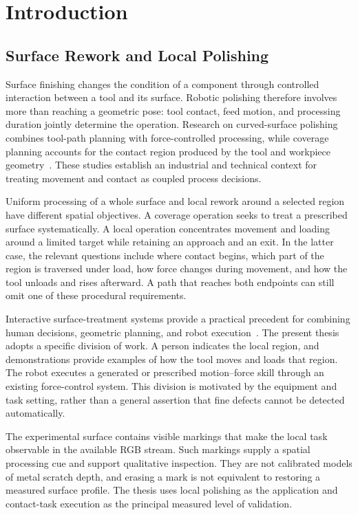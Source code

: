 \chapter{Introduction}
\label{chap:introduction}

\section{Surface Rework and Local Polishing}
Surface finishing changes the condition of a component through controlled interaction between a tool and its surface. Robotic polishing therefore involves more than reaching a geometric pose: tool contact, feed motion, and processing duration jointly determine the operation. Research on curved-surface polishing combines tool-path planning with force-controlled processing, while coverage planning accounts for the contact region produced by the tool and workpiece geometry~\cite{mohsin2019path,schneyer2023segmentation}. These studies establish an industrial and technical context for treating movement and contact as coupled process decisions.

Uniform processing of a whole surface and local rework around a selected region have different spatial objectives. A coverage operation seeks to treat a prescribed surface systematically. A local operation concentrates movement and loading around a limited target while retaining an approach and an exit. In the latter case, the relevant questions include where contact begins, which part of the region is traversed under load, how force changes during movement, and how the tool unloads and rises afterward. A path that reaches both endpoints can still omit one of these procedural requirements.

Interactive surface-treatment systems provide a practical precedent for combining human decisions, geometric planning, and robot execution~\cite{alt2024robogrind}. The present thesis adopts a specific division of work. A person indicates the local region, and demonstrations provide examples of how the tool moves and loads that region. The robot executes a generated or prescribed motion--force skill through an existing force-control system. This division is motivated by the equipment and task setting, rather than a general assertion that fine defects cannot be detected automatically.

The experimental surface contains visible markings that make the local task observable in the available RGB stream. Such markings supply a spatial processing cue and support qualitative inspection. They are not calibrated models of metal scratch depth, and erasing a mark is not equivalent to restoring a measured surface profile. The thesis uses local polishing as the application and contact-task execution as the principal measured level of validation.

